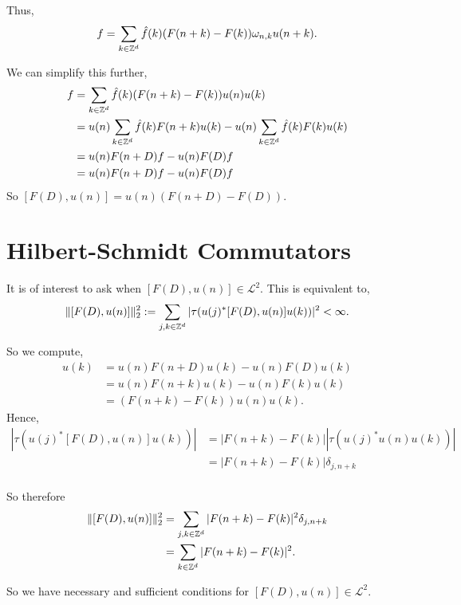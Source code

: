Thus,
\begin{equation}
    [F(D),u(n)]f = \sum_{k \in \Itgr^d} \hat{f}(k) (F(n+k)-F(k))\omega_{n,k}u(n+k).
\end{equation}

We can simplify this further,
\begin{align}
    [F(D),u(n)]f &= \sum_{k \in \Itgr^d} \hat{f}(k) (F(n+k)-F(k))u(n)u(k)\\
                 &= u(n)\sum_{k \in \Itgr^d}  \hat{f}(k) F(n+k)u(k) - u(n) \sum_{k \in \Itgr^d} \hat{f}(k)F(k)u(k)\\
                 &= u(n) F(n+D)f - u(n)F(D)f\\
                 \label{commutatorFormula}
                 &= u(n)F(n+D)f - u(n)F(D)f
\end{align}
So $[F(D),u(n)] = u(n)(F(n+D)-F(D))$. 

\section{Hilbert-Schmidt Commutators}
It is of interest to ask when $[F(D),u(n)] \in \mathcal{L}^2$. This is equivalent to,
\begin{equation}
    \|[F(D),u(n)]\|_{2}^2 := \sum_{j,k \in \mathbb{Z}^d} |\tau(u(j)^* [F(D),u(n)]u(k))|^2 < \infty.
\end{equation}

So we compute,
\begin{align}
    [F(D),u(n)]u(k) &= u(n)F(n+D)u(k) - u(n)F(D)u(k)\\
                    &= u(n)F(n+k)u(k) - u(n)F(k)u(k)\\
                    &= (F(n+k)-F(k))u(n)u(k).
\end{align}
Hence,
\begin{align}
    |\tau(u(j)^*[F(D),u(n)]u(k))| &= |F(n+k)-F(k)||\tau(u(j)^*u(n)u(k))|\\
                                  &= |F(n+k)-F(k)|\delta_{j,n+k}\\
\end{align}

So therefore
\begin{align}
\label{HSConditions}
    \|[F(D),u(n)]\|_{2}^2 &= \sum_{j,k \in \Itgr^d} |F(n+k)-F(k)|^2 \delta_{j,n+k}\\
                          &= \sum_{k \in \Itgr^d} |F(n+k)-F(k)|^2.
\end{align}

So we have necessary and sufficient conditions for $[F(D),u(n)] \in \mathcal{L}^2$. 

